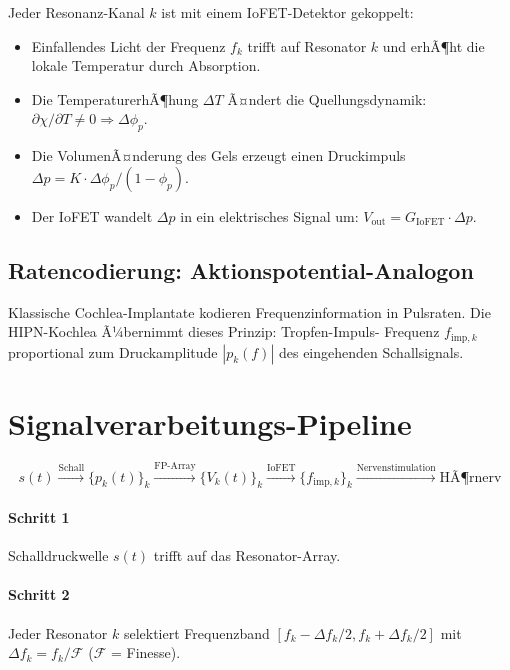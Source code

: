 ﻿\documentclass[a4paper,12pt]{scrreprt}
\theoremstyle{definition}
\begin{document}
Jeder Resonanz-Kanal $k$ ist mit einem IoFET-Detektor gekoppelt:
\begin{itemize}
  \item Einfallendes Licht der Frequenz $f_k$ trifft auf Resonator $k$
    und erhÃ¶ht die lokale Temperatur durch Absorption.
  \item Die TemperaturerhÃ¶hung $\Delta T$ Ã¤ndert die Quellungsdynamik:
    $\partial\chi/\partial T \neq 0 \Rightarrow \Delta\phi_p$.
  \item Die VolumenÃ¤nderung des Gels erzeugt einen Druckimpuls
    $\Delta p = K \cdot \Delta\phi_p / (1-\phi_p)$.
  \item Der IoFET wandelt $\Delta p$ in ein elektrisches Signal um:
    $V_{\mathrm{out}} = G_{\mathrm{IoFET}} \cdot \Delta p$.
\end{itemize}

\subsection{Ratencodierung: Aktionspotential-Analogon}

Klassische Cochlea-Implantate kodieren Frequenzinformation in
Pulsraten. Die HIPN-Kochlea Ã¼bernimmt dieses Prinzip: Tropfen-Impuls-
Frequenz $f_{\mathrm{imp},k}$ proportional zum Druckamplitude
$|p_k(f)|$ des eingehenden Schallsignals.

\section{Signalverarbeitungs-Pipeline}

\begin{equation}
  s(t) \xrightarrow{\text{Schall}} \{p_k(t)\}_k
  \xrightarrow{\text{FP-Array}} \{V_k(t)\}_k
  \xrightarrow{\text{IoFET}} \{f_{\mathrm{imp},k}\}_k
  \xrightarrow{\text{Nervenstimulation}} \text{HÃ¶rnerv}
\end{equation}

\paragraph{Schritt 1} Schalldruckwelle $s(t)$ trifft auf das Resonator-Array.

\paragraph{Schritt 2} Jeder Resonator $k$ selektiert Frequenzband
$[f_k - \Delta f_k/2, f_k + \Delta f_k/2]$ mit
$\Delta f_k = f_k / \mathcal{F}$ ($\mathcal{F}$ = Finesse).
\end{document}
